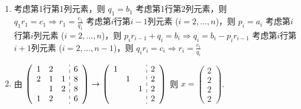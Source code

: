  \subsection{} %


	 \paragraph{} %
		 \begin{enumerate}
			 \item %
			       考虑第1行第1列元素，则 $q_1 = b_1$
			       考虑第1行第2列元素，则 $q_1r_1 = c_1 \Rightarrow r_1 = \frac{c_1}{q_1}$
			       考虑第$i$行第$i-1$列元素 ($i=2,\dots,n$)，则 $p_i = a_i$
			       考虑第$i$行第$i$列元素 ($i=2,\dots,n$)，则 $p_ir_{i-1}+q_i = b_i \Rightarrow q_i = b_i - p_ir_{i-1}$
			       考虑第$i$行第$i+1$列元素 ($i=2,\dots,n-1$)，则 $q_ir_i = c_i \Rightarrow r_i = \frac{c_i}{q_i}$

			 \item %
			       由 $\left(\begin{array}{ccc:c}
					       1 & 2 &   & 6 \\
					       2 & 1 & 1 & 8 \\
					         & 1 & 2 & 8 \\
					       1 & 2 &   & 6
				       \end{array}\right) \to \left(\begin{array}{ccc:c}
					       1 &   &   & 2 \\
					         & 1 &   & 2 \\
					         &   & 1 & 2 \\
					         &   &   & 2
				       \end{array}\right)$
			       则 $x = \begin{pmatrix}
					       2 \\
					       2 \\
					       2 \\
					       2
				       \end{pmatrix}$.
		 \end{enumerate}


